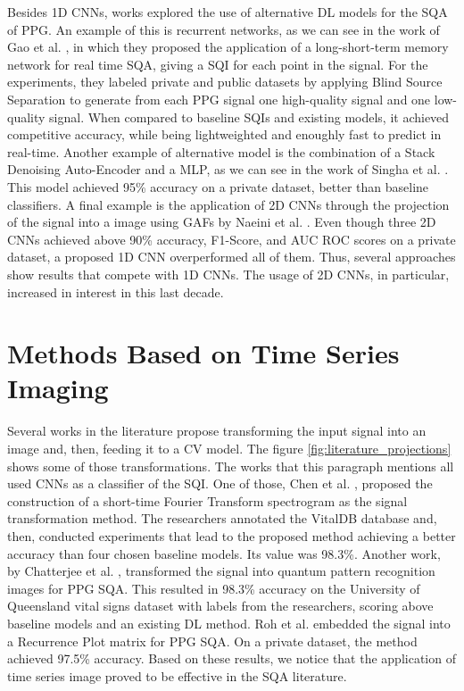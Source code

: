 Besides 1D \gls{CNN}s, works explored the use of alternative \gls{DL} models for the \gls{SQA} of \gls{PPG}. An example of this is recurrent networks, as we can see in the work of Gao et al. \cite{deep-learning-4}, in which they proposed the application of a long-short-term memory network for real time \gls{SQA}, giving a \gls{SQI} for each point in the signal. For the experiments, they labeled private and public datasets by applying Blind Source Separation to generate from each \gls{PPG} signal one high-quality signal and one low-quality signal. When compared to baseline \gls{SQI}s and existing models, it achieved competitive accuracy, while being lightweighted and enoughly fast to predict in real-time. Another example of alternative model is the combination of a Stack Denoising Auto-Encoder and a \gls{MLP}, as we can see in the work of Singha et al. \cite{deep-learning-5}. This model achieved 95\% accuracy on a private dataset, better than baseline classifiers. A final example is the application of 2D \glspl{CNN} through the projection of the signal into a image using \glspl{GAF} by Naeini et al. \cite{deep-learning-6}. Even though three 2D \glspl{CNN} achieved above 90\% accuracy, F1-Score, and \gls{AUC} \gls{ROC} scores on a private dataset, a proposed 1D \gls{CNN} overperformed all of them. Thus, several approaches show results that compete with 1D \glspl{CNN}. The usage of 2D \glspl{CNN}, in particular, increased in interest in this last decade.


\section{Methods Based on Time Series Imaging}
\label{sec:imaging}

Several works in the literature propose transforming the input signal into an image and, then, feeding it to a \gls{CV} model. The figure \ref{fig:literature_projections} shows some of those transformations. The works that this paragraph mentions all used \gls{CNN}s as a classifier of the \gls{SQI}. One of those, Chen et al. \cite{imaging-1}, proposed the construction of a short-time Fourier Transform spectrogram as the signal transformation method. The researchers annotated the VitalDB database and, then, conducted experiments that lead to the proposed method achieving a better accuracy than four chosen baseline models. Its value was 98.3\%. Another work, by Chatterjee et al. \cite{imaging-2}, transformed the signal into quantum pattern recognition images for PPG \gls{SQA}. This resulted in 98.3\% accuracy on the University of Queensland vital signs dataset with labels from the researchers, scoring above baseline models and an existing \gls{DL} method. Roh et al. \cite{imaging-3} embedded the signal into a Recurrence Plot matrix for PPG \gls{SQA}. On a private dataset, the method achieved 97.5\% accuracy. Based on these results, we notice that the application of time series image proved to be effective in the \gls{SQA} literature.


